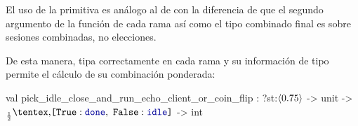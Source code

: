El uso de la primitiva es análogo al de  con la diferencia de que
el segundo argumento de la función de cada rama así como el tipo combinado
final es sobre sesiones combinadas, no elecciones.

\ValidPickIdleCloseRunEchoClientOrCoinFlip

De esta manera,  tipa correctamente en cada rama y su información de
tipo permite el cálculo de su combinación ponderada:

\begin{table}[htb]
	\begin{OCamlD}
  val pick_idle_close_and_run_echo_client_or_coin_flip :
              ?st:$\ClosedSessionType[0.75]$ -> unit -> $\BinaryPChoice[\frac{1}{2}]{\Done}{\Idle}$ -> int
	\end{OCamlD}
\end{table}
